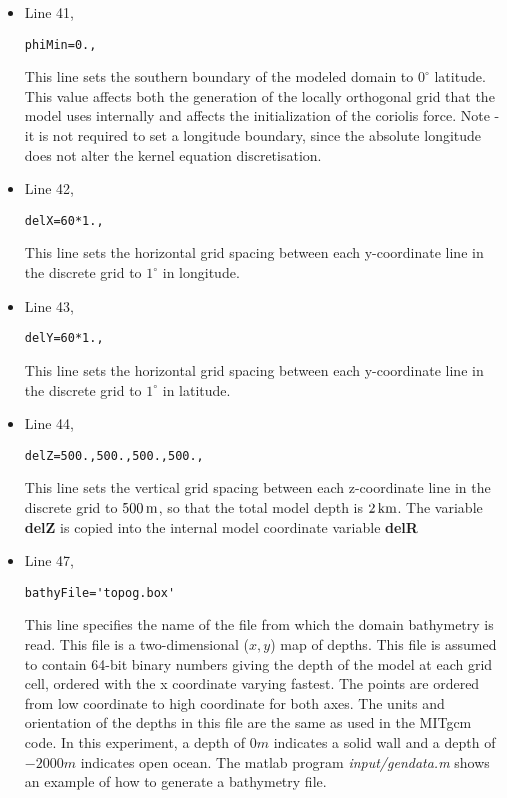 \begin{itemize}
\item Line 41,
\begin{verbatim}
phiMin=0.,
\end{verbatim}
This line sets the southern boundary of the modeled
domain to $0^{\circ}$ latitude. This value affects both the
generation of the locally orthogonal grid that the model
uses internally and affects the initialization of the coriolis force.
Note - it is not required to set
a longitude boundary, since the absolute longitude does
not alter the kernel equation discretisation.

\item Line 42,
\begin{verbatim}
delX=60*1.,
\end{verbatim}
This line sets the horizontal grid spacing between each y-coordinate line
in the discrete grid to $1^{\circ}$ in longitude.

\item Line 43,
\begin{verbatim}
delY=60*1.,
\end{verbatim}
This line sets the horizontal grid spacing between each y-coordinate line
in the discrete grid to $1^{\circ}$ in latitude.

\item Line 44,
\begin{verbatim}
delZ=500.,500.,500.,500.,
\end{verbatim}
This line sets the vertical grid spacing between each z-coordinate line
in the discrete grid to $500\,{\rm m}$, so that the total model depth 
is $2\,{\rm km}$. The variable {\bf delZ} is copied into the internal
model coordinate variable {\bf delR}


\item Line 47,
\begin{verbatim}
bathyFile='topog.box'
\end{verbatim}
This line specifies the name of the file from which the domain
bathymetry is read. This file is a two-dimensional ($x,y$) map of
depths. This file is assumed to contain 64-bit binary numbers 
giving the depth of the model at each grid cell, ordered with the x 
coordinate varying fastest. The points are ordered from low coordinate
to high coordinate for both axes. The units and orientation of the
depths in this file are the same as used in the MITgcm code. In this
experiment, a depth of $0m$ indicates a solid wall and a depth
of $-2000m$ indicates open ocean. The matlab program
{\it input/gendata.m} shows an example of how to generate a
bathymetry file.



\end{itemize}
